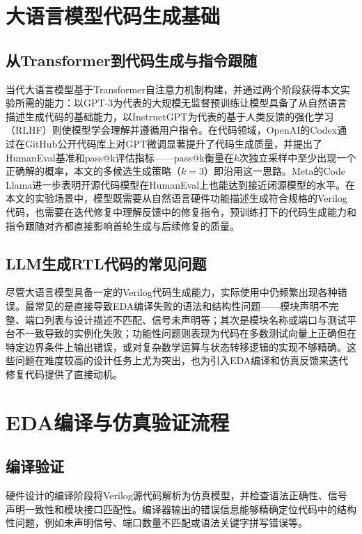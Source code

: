 \section{大语言模型代码生成基础}

\subsection{从Transformer到代码生成与指令跟随}

当代大语言模型基于Transformer自注意力机制\cite{transformer}构建，并通过两个阶段获得本文实验所需的能力：以GPT-3\cite{gpt3}为代表的大规模无监督预训练让模型具备了从自然语言描述生成代码的基础能力，以InstructGPT\cite{instructgpt}为代表的基于人类反馈的强化学习（RLHF）则使模型学会理解并遵循用户指令。在代码领域，OpenAI的Codex\cite{codex}通过在GitHub公开代码库上对GPT微调显著提升了代码生成质量，并提出了HumanEval基准和pass@k评估指标——pass@k衡量在$k$次独立采样中至少出现一个正确解的概率，本文的多候选生成策略（$k=3$）即沿用这一思路。Meta的Code Llama\cite{codellama}进一步表明开源代码模型在HumanEval上也能达到接近闭源模型的水平。在本文的实验场景中，模型既需要从自然语言硬件功能描述生成符合规格的Verilog代码，也需要在迭代修复中理解反馈中的修复指令，预训练打下的代码生成能力和指令跟随对齐都直接影响首轮生成与后续修复的质量。

\subsection{LLM生成RTL代码的常见问题}

尽管大语言模型具备一定的Verilog代码生成能力，实际使用中仍频繁出现各种错误。最常见的是直接导致EDA编译失败的语法和结构性问题——模块声明不完整、端口列表与设计描述不匹配、信号未声明等；其次是模块名称或端口与测试平台不一致导致的实例化失败；功能性问题则表现为代码在多数测试向量上正确但在特定边界条件上输出错误，或对复杂数学运算与状态转移逻辑的实现不够精确。这些问题在难度较高的设计任务上尤为突出，也为引入EDA编译和仿真反馈来迭代修复代码提供了直接动机。

\section{EDA编译与仿真验证流程}

\subsection{编译验证}

硬件设计的编译阶段将Verilog源代码解析为仿真模型，并检查语法正确性、信号声明一致性和模块接口匹配性。编译器输出的错误信息能够精确定位代码中的结构性问题，例如未声明信号、端口数量不匹配或语法关键字拼写错误等。

